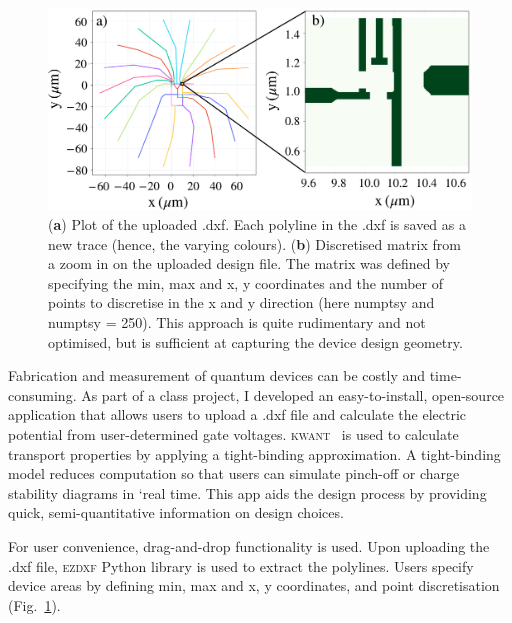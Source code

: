 \begin{figure}[!bht]
 \begin{center}
 \includegraphics[width=1.0\textwidth]{figures/appendix/appendix2_load.pdf}
 \caption[Loading a DXF Design]{\label{fig:appx/kwant_load} 
 (\textbf{a}) Plot of the uploaded .dxf. Each polyline in the .dxf is saved as a new trace (hence, the varying colours). (\textbf{b}) Discretised matrix from a zoom in on the uploaded design file. The matrix was defined by specifying the min, max and x, y coordinates and the number of points to discretise in the x and y direction (here numptsy and numptsy = 250). This approach is quite rudimentary and not optimised, but is sufficient at capturing the device design geometry.}
 \end{center}
\end{figure}



Fabrication and measurement of quantum devices can be costly and time-consuming. As part of a class project, I developed an easy-to-install, open-source application that allows users to upload a .dxf file and calculate the electric potential from user-determined gate voltages.
\textsc{kwant}~\cite{kwant} is used to calculate transport properties by applying a tight-binding approximation. A tight-binding model reduces computation so that users can simulate pinch-off or charge stability diagrams in `real time. This app aids the design process by providing quick, semi-quantitative information on design choices. 




For user convenience, drag-and-drop functionality is used. Upon uploading the .dxf file, \textsc{ezdxf} Python library is used to extract the polylines. Users specify device areas by defining min, max and x, y coordinates, and point discretisation (Fig.~\ref{fig:appx/kwant_load}). 


